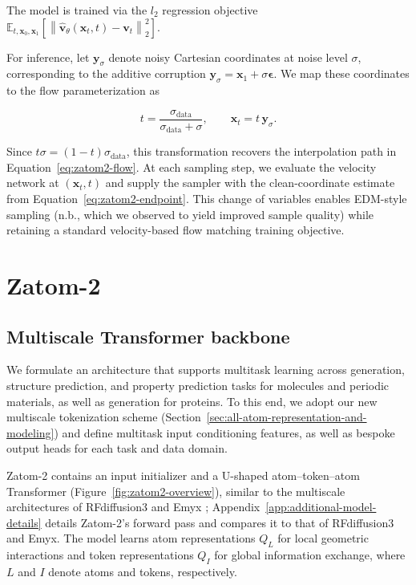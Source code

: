 \documentclass{article} %
\begin{document}
The model is trained via the $l_2$ regression objective 
$\mathbb{E}_{t,\mathbf{x}_0,\mathbf{x}_1}\!\left[
\left\|\widehat{\mathbf{v}}_\theta(\mathbf{x}_t,t)-\mathbf{v}_t\right\|_2^2
\right]$.

For inference, let $\mathbf{y}_\sigma$ denote noisy Cartesian coordinates at noise level
$\sigma$, corresponding to the additive corruption
$\mathbf{y}_\sigma=\mathbf{x}_1+\sigma\boldsymbol{\epsilon}$.
We map these coordinates to the flow parameterization as


\begin{equation}
t=\frac{\sigma_{\mathrm{data}}}{\sigma_{\mathrm{data}}+\sigma},
\qquad
\mathbf{x}_t=t\,\mathbf{y}_\sigma.
\label{eq:edm-flow-adapter}
\end{equation}

Since $t\sigma=(1-t)\sigma_{\mathrm{data}}$, this transformation recovers
the interpolation path in Equation~\ref{eq:zatom2-flow}. At each sampling step,
we evaluate the velocity network at $(\mathbf{x}_t,t)$ and supply the sampler
with the clean-coordinate estimate from Equation~\ref{eq:zatom2-endpoint}.
This change of variables enables EDM-style sampling\citep{karras2022edm,butcher2025rfdiffusion3,williams2026emyx} (n.b., which we observed to yield improved sample quality) while retaining a standard velocity-based flow matching training objective.

\section{Zatom-2}
\label{sec:zatom2}

\subsection{Multiscale Transformer backbone}
\label{sec:zatom2-backbone}

We formulate an architecture that supports multitask learning across generation, structure prediction, and property prediction tasks for molecules and periodic materials, as well as generation for proteins. To this end, we adopt our new multiscale tokenization scheme (Section~\ref{sec:all-atom-representation-and-modeling}) and define multitask input conditioning features, as well as bespoke output heads for each task and data domain. 

Zatom-2 contains an input initializer and a U-shaped atom--token--atom Transformer (Figure~\ref{fig:zatom2-overview}), similar to the multiscale
architectures
of RFdiffusion3 and Emyx \citep{butcher2025rfdiffusion3,williams2026emyx}; Appendix~\ref{app:additional-model-details} details Zatom-2's forward pass and compares it to that of RFdiffusion3 and Emyx. The model learns atom representations $Q_L$ for local geometric interactions and token representations $Q_I$ for global information exchange, where $L$ and $I$ denote atoms and tokens, respectively.
\end{document}
